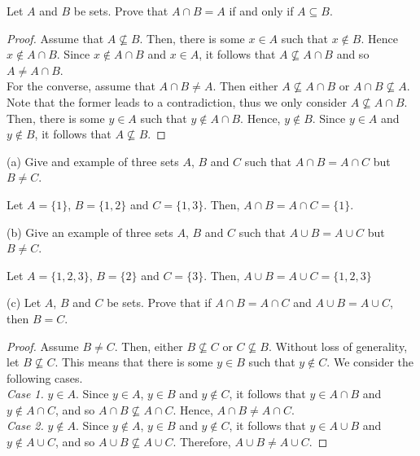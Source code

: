 \documentclass[12pt]{article}
\newenvironment{problem}[2][Problem]{\begin{trivlist}
		\item[\hskip \labelsep {\bfseries #1}\hskip \labelsep {\bfseries #2.}]}{\end{trivlist}}
\newenvironment{solution}[2][Solution]{\begin{trivlist}
		\item[\hskip \labelsep {\bfseries #1}\hskip \labelsep {\bfseries #2.}]}{\end{trivlist}}
\begin{document}
	\begin{problem}{42}
		Let $A$ and $B$ be sets. Prove that $A\cap B= A$ if and only if $A \subseteq B$.
		\begin{proof}
			Assume that $A \not\subseteq B$. Then, there is some $x \in A$ such that $x \not\in B$. Hence $x\not\in A\cap B$. Since $x\not\in A\cap B$ and $x\in A$, it follows that $A\not\subseteq A\cap B$ and so $A \neq A\cap B$.\\
			
			For the converse, assume that $A\cap B \neq A$. Then either $A\not\subseteq A\cap B$ or $A\cap B \not\subseteq A$. Note that the former leads to a contradiction, thus we only consider $A\not\subseteq A\cap B$. Then, there is some $y\in A$ such that $y\not\in A\cap B$. Hence, $y\not\in B$. Since $y\in A$ and $y\not\in B$, it follows that $A\not\subseteq B$.
		\end{proof}
	\end{problem}

	\begin{problem}{43}
		(a) Give and example of three sets $A$, $B$ and $C$ such that $A\cap B = A\cap C$ but $B\neq C$.
		\begin{solution}{a}
			Let $A=\{1\}$, $B=\{1,2\}$ and $C=\{1,3\}$. Then, $A\cap B = A\cap C = \{1\}$.
		\end{solution} 
		(b) Give an example of three sets $A$, $B$ and $C$ such that $A\cup B = A\cup C$ but $B\neq C$.
		\begin{solution}{b}
			Let $A=\{1,2,3\}$, $B=\{2\}$ and $C=\{3\}$. Then, $A\cup B=A\cup C = \{1,2,3\}$
		\end{solution}
		(c) Let $A$, $B$ and $C$ be sets. Prove that if $A\cap B = A\cap C$ and $A\cup B = A\cup C$, then $B=C$.
		\begin{proof}
			Assume $B\neq C$. Then, either $B\not\subseteq C$ or $C\not\subseteq B$. Without loss of generality, let $B\not\subseteq C$. This means that there is some $y\in B$ such that $y\not\in C$. We consider the following cases.\\
			\textit{Case 1.} $y\in A$. Since $y\in A$, $y \in B$ and $y\not\in C$, it follows that $y\in A\cap B$ and $y\not\in A\cap C$, and so $A\cap B \not\subseteq A\cap C$. Hence, $A\cap B \neq A\cap C$.\\
			\textit{Case 2.} $y\not\in A$. Since $y\not\in A$, $y \in B$ and $y\not\in C$, it follows that $y \in A\cup B$ and $y\not\in A\cup C$, and so $A\cup B \not\subseteq A\cup C$. Therefore, $A\cup B \neq A\cup C$.
		\end{proof}
	\end{problem}
\end{document}
